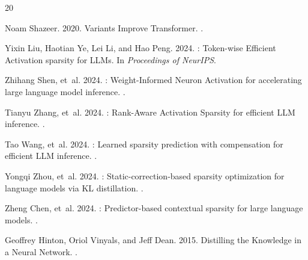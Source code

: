 \documentclass[11pt,a4paper]{article}
\begin{document}
\begin{thebibliography}{20}

Noam Shazeer. 2020.
 Variants Improve Transformer.
.

Yixin Liu, Haotian Ye, Lei Li, and Hao Peng. 2024.
: Token-wise Efficient Activation sparsity for {LLM}s.
\newblock In {\em Proceedings of NeurIPS}.

Zhihang Shen, et~al. 2024.
: Weight-Informed Neuron Activation for accelerating large language model inference.
.

Tianyu Zhang, et~al. 2024.
: Rank-Aware Activation Sparsity for efficient {LLM} inference.
.

Tao Wang, et~al. 2024.
: Learned sparsity prediction with compensation for efficient {LLM} inference.
.

Yongqi Zhou, et~al. 2024.
: Static-correction-based sparsity optimization for language models via {KL} distillation.
.

Zheng Chen, et~al. 2024.
: Predictor-based contextual sparsity for large language models.
.

Geoffrey Hinton, Oriol Vinyals, and Jeff Dean. 2015.
\newblock Distilling the Knowledge in a Neural Network.
.

\end{thebibliography}
\end{document}
